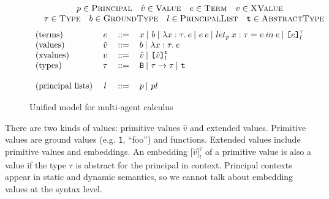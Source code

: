 \documentclass{article}
\newcommand{\emb}[3]{\texttt{[}#1\texttt{]}_{#2}^{#3}}
\newcommand{\tslam}[3]{\lambda #1 : #2. \: #3}
\newcommand{\quotes}[1]{``#1''}
\newcommand\icode[1]{\texttt{#1}}
\begin{document}
\begin{figure}[!htbp]
	\[
	\begin{tabular}{c}
		$p \in \textsc{Principal} \quad \hat{v} \in \textsc{Value} \quad e \in \textsc{Term} 
		\quad v \in \textsc{XValue}$ \\ 
	  $\quad \tau \in \textsc{Type} \quad b \in \textsc{GroundType} \quad l \in \textsc{PrincipalList}
		\quad \texttt{t} \in \textsc{AbstractType} $
	\end{tabular}
	\]
	\[	
	\begin{tabular}{ l c l l}	
		(terms) & $e$ & $::=$ &  $x \:|$  $b \: |$  $\tslam{x}{\tau}{e} \:| $ $e \: e \: |$  $
let_p \: x : \tau = e \: in \: e \: |$  $ \emb{e}{l}{\tau}$\\	
		(values) & $\hat{v}$ & $::=$ & $b \: |$  $\tslam{x}{\tau}{e} $  \\
		(xvalues) & $ v $ & $::=$& $\hat{v} \:|$  $ \emb{\hat{v}}{l}{\texttt{t}}$\\
		(types) & $\tau$ & $::=$ &  $\texttt{B} \:|$  $\tau \rightarrow \tau \: |$  $ \texttt{t
}$\\
		& & & \\
	 (principal lists) & 	$ l $ & $::=$ & $ p \: |$  $ pl $ \\ 		
	
	\end{tabular}
	\]
		\caption{Unified model for multi-agent calculus}
		\label{fig:unified_model_multi-agent}
	\end{figure}
	
	There are two kinds of values: primitive values $\hat{v}$ and extended values. Primitive values are ground values (e.g. \icode{1}, \quotes{foo}) and functions. Extended values include primitive values and embeddings. An embedding $\emb{\hat{v}}{l}{\tau}$ of a primitive value is also a value if the type $\tau$ is abstract for the principal in context. Principal contexts appear in static and dynamic semantics, so we cannot talk about embedding values at the syntax level. 
	
\end{document}
